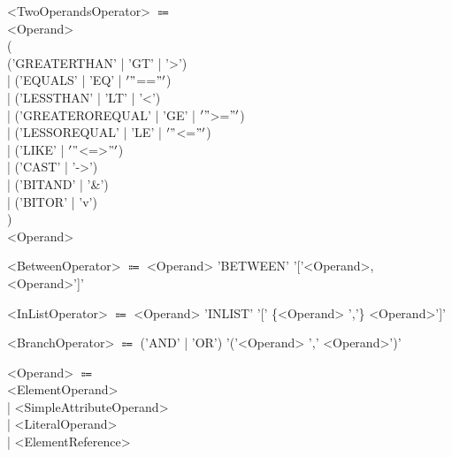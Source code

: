 \documentclass[10pt]{scrreprt}
\begin{document}
\begin{tabbing}
<TwoOperandsOperator> $\Coloneqq$ \\ \hspace{10mm} <Operand> \\ \hspace{10mm} ( \\ \hspace{12mm} ('GREATERTHAN' | 'GT' | '>') \\ \hspace{10mm}
| ('EQUALS' | 'EQ' | \('"\)==\("'\)) \\ \hspace{10mm} | ('LESSTHAN' | 'LT' | '<')
\\ \hspace{10mm} | ('GREATEROREQUAL' | 'GE' | \('"\)>=\("'\)) \\ \hspace{10mm} | ('LESSOREQUAL' | 'LE' | \('"\)<=\("'\)) \\ \hspace{10mm} |
('LIKE' | \('"\)<=>\("'\)) \\ \hspace{10mm} | ('CAST' | '->')
\\ \hspace{10mm} | ('BITAND' | '\&') \\ \hspace{10mm} | ('BITOR' | 'v') \\ \hspace{10mm} ) \\ \hspace{10mm} <Operand>
\end{tabbing}
\begin{tabbing}
<BetweenOperator> $\Coloneqq$ <Operand> 'BETWEEN' '['<Operand>, <Operand>']'
\end{tabbing}
\begin{tabbing}
<InListOperator> $\Coloneqq$ <Operand> 'INLIST' '[' \{<Operand> ','\} <Operand>']'
\end{tabbing}
\begin{tabbing}
<BranchOperator> $\Coloneqq$ ('AND' | 'OR') '('<Operand> ',' <Operand>')'
\end{tabbing}
\begin{tabbing}
<Operand> $\Coloneqq$ \\ \hspace{12mm} <ElementOperand> \\ \hspace{10mm} | <SimpleAttributeOperand> \\ \hspace{10mm} | <LiteralOperand> \\ \hspace{10mm} | <ElementReference>
\end{tabbing}
\end{document}
